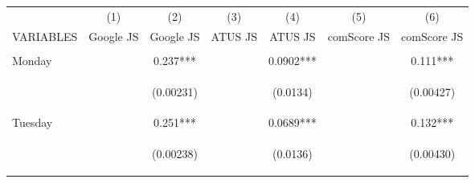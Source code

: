 \begin{center}
\begin{tabular}{lcccccc} \hline
 & (1) & (2) & (3) & (4) & (5) & (6) \\
VARIABLES & Google JS & Google JS & ATUS JS & ATUS JS & comScore JS & comScore JS \\ \hline
\vspace{4pt} & \begin{footnotesize}\end{footnotesize} & \begin{footnotesize}\end{footnotesize} & \begin{footnotesize}\end{footnotesize} & \begin{footnotesize}\end{footnotesize} & \begin{footnotesize}\end{footnotesize} & \begin{footnotesize}\end{footnotesize} \\
Monday &  & 0.237*** &  & 0.0902*** &  & 0.111*** \\
\vspace{4pt} & \begin{footnotesize}\end{footnotesize} & \begin{footnotesize}(0.00231)\end{footnotesize} & \begin{footnotesize}\end{footnotesize} & \begin{footnotesize}(0.0134)\end{footnotesize} & \begin{footnotesize}\end{footnotesize} & \begin{footnotesize}(0.00427)\end{footnotesize} \\
Tuesday &  & 0.251*** &  & 0.0689*** &  & 0.132*** \\
\vspace{4pt} & \begin{footnotesize}\end{footnotesize} & \begin{footnotesize}(0.00238)\end{footnotesize} & \begin{footnotesize}\end{footnotesize} & \begin{footnotesize}(0.0136)\end{footnotesize} & \begin{footnotesize}\end{footnotesize} & \begin{footnotesize}(0.00430)\end{footnotesize} \\

\end{tabular}
\end{center}
